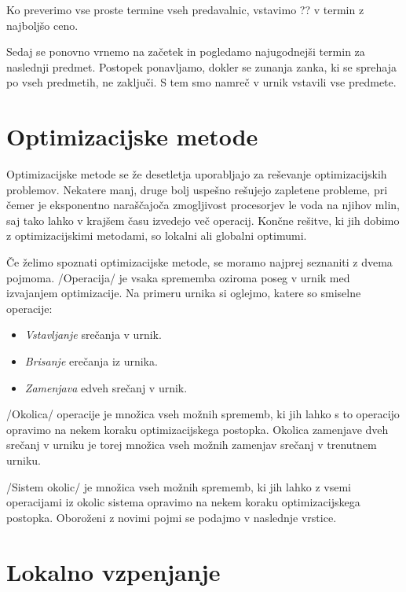 \documentclass[a4paper,10pt]{article}
\begin{document}
   Ko preverimo vse proste termine vseh predavalnic, vstavimo ??
   v termin z najboljšo ceno.

   Sedaj se ponovno vrnemo na začetek in pogledamo najugodnejši termin za naslednji
   predmet. Postopek ponavljamo, dokler se zunanja zanka, ki se sprehaja po vseh predmetih,
   ne zaključi. S tem smo namreč v urnik vstavili vse predmete.

\section{Optimizacijske metode}

Optimizacijske metode se že desetletja uporabljajo za reševanje optimizacijskih problemov.
Nekatere manj, druge bolj uspešno rešujejo zapletene probleme, pri čemer je eksponentno
naraščajoča zmogljivost procesorjev le voda na njihov mlin, saj tako lahko v krajšem
času izvedejo več operacij. Končne rešitve, ki jih dobimo z optimizacijskimi metodami,
so lokalni ali globalni optimumi.

Če želimo spoznati optimizacijske metode, se moramo najprej seznaniti z dvema pojmoma.
/Operacija/ je vsaka sprememba oziroma poseg v urnik med izvajanjem optimizacije.
Na primeru urnika si oglejmo, katere so smiselne operacije:

\begin{itemize}
 \item \emph{Vstavljanje} srečanja v urnik.
   \item \emph{Brisanje} erečanja iz urnika.
   \item \emph{Zamenjava} edveh srečanj v urnik.
\end{itemize}
%
/Okolica/ operacije je množica vseh možnih sprememb, ki jih lahko s to operacijo
opravimo na nekem koraku optimizacijskega postopka. Okolica zamenjave dveh srečanj v urniku
je torej množica vseh možnih zamenjav srečanj v trenutnem urniku.

/Sistem okolic/ je množica vseh možnih sprememb, ki jih lahko z vsemi operacijami iz
okolic sistema opravimo na nekem koraku optimizacijskega postopka. Oboroženi z novimi pojmi
se podajmo v naslednje vrstice.

\section{Lokalno vzpenjanje}
\end{document}
